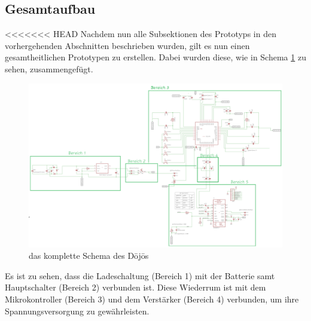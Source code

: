 \subsection{Gesamtaufbau} \label{sec:gesamtaufbau}
<<<<<<< HEAD
Nachdem nun alle Subsektionen des Prototyps in den vorhergehenden Abschnitten beschrieben wurden, gilt es nun einen gesamtheitlichen Prototypen zu erstellen. Dabei wurden diese, wie in Schema \ref{fig:dojo-schema} zu sehen, zusammengefügt. 

\begin{figure}[H]
	\begin{center}
		\includegraphics[width=160mm]{data/dojo-schema_2.png}
		\caption[das komplette Schema des Dōjōs]{das komplette Schema des Dōjōs} %
		\label{fig:dojo-schema}
	\end{center}
\end{figure}

Es ist zu sehen, dass die Ladeschaltung (Bereich 1) mit der Batterie samt Hauptschalter (Bereich 2) verbunden ist. Diese Wiederrum ist mit dem Mikrokontroller (Bereich 3) und dem Verstärker (Bereich 4) verbunden, um ihre Spannungsversorgung zu gewährleisten.
 
